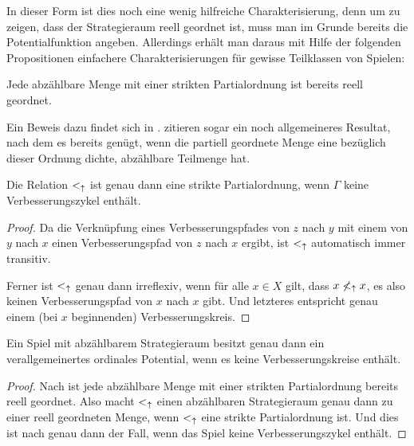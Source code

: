 In dieser Form ist dies noch eine wenig hilfreiche Charakterisierung, denn um zu zeigen, dass der Strategieraum reell geordnet ist, muss man im Grunde bereits die Potentialfunktion angeben. Allerdings erhält man daraus mit Hilfe der folgenden Propositionen einfachere Charakterisierungen für gewisse Teilklassen von Spielen:

\begin{prop}\label{prop:AbzReellGeordnet}
	Jede abzählbare Menge mit einer strikten Partialordnung ist bereits reell geordnet.
\end{prop}

Ein Beweis dazu findet sich in \cite[Lemma 2.2]{CharExOrdPot}. \citeauthor{CharExOrdPot} zitieren sogar ein noch allgemeineres Resultat, nach dem es bereits genügt, wenn die partiell geordnete Menge eine bezüglich dieser Ordnung dichte, abzählbare Teilmenge hat.

\begin{prop}\label{prop:VerRelPartOrdVerbz}
	Die Relation $<_\uparrow$ ist genau dann eine strikte Partialordnung, wenn $\Gamma$ keine Verbesserungszykel enthält.
\end{prop}

\begin{proof}
	Da die Verknüpfung eines Verbesserungspfades von $z$ nach $y$ mit einem von $y$ nach $x$ einen Verbesserungspfad von $z$ nach $x$ ergibt, ist $<_\uparrow$ automatisch immer transitiv.
	
	Ferner ist $<_\uparrow$ genau dann irreflexiv, wenn für alle $x \in X$ gilt, dass $x \not<_\uparrow x$, es also keinen Verbesserungspfad von $x$ nach $x$ gibt. Und letzteres entspricht genau einem (bei $x$ beginnenden) Verbesserungskreis.
\end{proof}

\begin{kor}\label{kor:CharExVerOrdPotabzX}
	Ein Spiel mit abzählbarem Strategieraum besitzt genau dann ein verallgemeinertes ordinales Potential, wenn es keine Verbesserungskreise enthält.
\end{kor}

\begin{proof}
	Nach  ist jede abzählbare Menge mit einer strikten Partialordnung bereits reell geordnet. Also macht $<_\uparrow$ einen abzählbaren Strategieraum genau dann zu einer reell geordneten Menge, wenn $<_\uparrow$ eine strikte Partialordnung ist. Und dies ist nach  genau dann der Fall, wenn das Spiel keine Verbesserungszykel enthält.
\end{proof}

